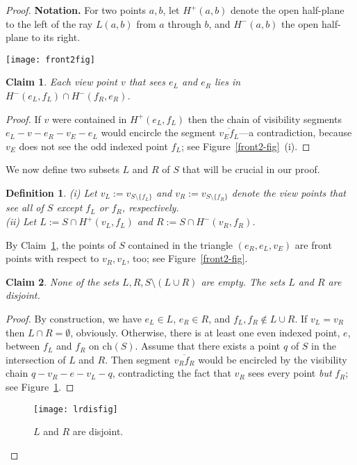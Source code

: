 \documentclass[11pt]{article}
\newtheorem{definition}{Definition}
\newtheorem{claim}{Claim}
\begin{document}
\begin{proof}
{\bf Notation.}
For two points $a,b$, let $H^+(a,b)$  denote the open half-plane to the left of the
ray $L(a,b)$ from $a$ through $b$, and $H^-(a,b)$ the open half-plane to its right.
\begin{figure*}[hbtp]\begin{center}\texttt{[image: front2fig]}\caption{(i) As segment $\overline{v_Ef_L}$ must be intersected by the boundary of $P$, it cannot
    be encircled by visibility segments. (ii) Defining subsets $L$ and $R$ of $S$.}\label{front2-fig}
  \end{center}\end{figure*}


\begin{claim}         \label{newfront-claim}
Each view point $v$ that sees $e_L$ and $e_R$ lies in $H^-(e_L,f_L) \cap H^-(f_R,e_R)$.
\end{claim}
\begin{proof}
If $v$ were contained in $H^+(e_L,f_L)$ then the chain of visibility segments 
$e_L-v-e_R-v_E-e_L$ would encircle the segment $\overline{v_Ef_L}$---a contradiction,
because $v_E$ does not see the odd indexed point $f_L$; see  Figure~\ref{front2-fig}~(i).
\end{proof}


We now define two subsets $L$ and $R$ of $S$ that will be crucial in our proof.
\begin{definition}    \label{lr-defi}
(i) Let $v_L:=v_{S\setminus \{f_L\}}$ and $v_R:=v_{S\setminus \{f_R\}}$
denote the view points that see all of $S$ except $f_L$ or $f_R$, respectively.\\
(ii) Let $L:= S \cap H^+(v_L, f_L)$ and $R:= S \cap H^-(v_R, f_R)$.
\end{definition}
By Claim~\ref{newfront-claim}, the points of $S$ contained in the triangle $(e_R, e_L, v_E)$ are front points with respect
to $v_R, v_L$, too; see Figure~\ref{front2-fig}.
\begin{claim}         \label{lr-claim}
None of the sets $L, R, S\setminus (L \cup R)$ are empty. The sets $L$ and $ R$ are disjoint. 
\end{claim}
\begin{proof}
By construction, we have $e_L \in L$, $e_R \in R$, and $f_L, f_R \not\in L \cup R$.
If $v_L=v_R$ then $L \cap R = \emptyset$, obviously. Otherwise, there is at least one
even indexed point, $e$, between $f_L$ and $f_R$ on $\mbox{ch}(S)$. Assume 
that there exists a point $q$ of $S$ in the intersection of $L$ and $R$. Then segment
$\overline{v_Rf_R}$ would be encircled by the visibility chain $q-v_R-e-v_L-q$, 
contradicting the fact that $v_R$ sees every point {\em but} $f_R$; see Figure~\ref{lrdis-fig}. 
\end{proof}
\begin{figure}[hbtp]\begin{center}\texttt{[image: lrdisfig]}\caption{$L$ and $R$ are disjoint.}\label{lrdis-fig}
  \end{center}\end{figure}



\end{proof}
\end{document}
